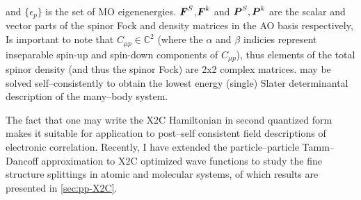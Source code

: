 and $\{\epsilon_p\}$ is the set of MO
eigenenergies. $\boldsymbol{F}^S$,$\boldsymbol{F}^k$ and $\boldsymbol{P}^S,\boldsymbol{P}^k$ are the scalar and
vector parts of the spinor Fock and density matrices in the AO basis
respectively, 
Is important to note that $C_{\mu p} \in \mathbb{C}^2$ (where the $\alpha$ and
$\beta$ indicies represent inseparable spin-up and spin-down components of
$C_{\mu p}$), thus elements of the total spinor density (and thus the spinor
Fock) are 2x2 complex matrices.   may be solved
self--consistently to obtain the lowest energy (single) Slater determinantal
description of the many--body system.

The fact that one may write the X2C Hamiltonian in second quantized form makes it
suitable for application to post--self consistent field descriptions of
electronic correlation. Recently, I have extended the particle--particle
Tamm--Dancoff approximation to X2C optimized wave functions to study the fine
structure splittings in atomic and molecular systems, of which results are
presented in \cref{sec:pp-X2C}.


